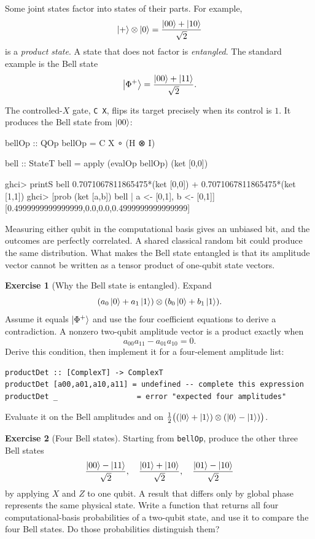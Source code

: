\documentclass[11pt,a4paper]{article}
\theoremstyle{definition}
\newtheorem{exercise}{Exercise}[section]
\begin{document}
Some joint states factor into states of their parts.  For example,
\[
  \left| + \right\rangle\otimes\left| 0 \right\rangle=\frac{\left| 00 \right\rangle+\left| 10 \right\rangle}{\sqrt2}
\]
is a \emph{product state}.  A state that does not factor is
\emph{entangled}.  The standard example is the Bell state
\[
  \left| \Phi^+ \right\rangle=\frac{\left| 00 \right\rangle+\left| 11 \right\rangle}{\sqrt2}.
\]

The controlled-$X$ gate, \lstinline|C X|, flips its target precisely when
its control is $1$.  It produces the Bell state from $\left| 00 \right\rangle$:
\begin{qppcode}
bellOp :: QOp
bellOp = C X ∘ (H ⊗ I)

bell :: StateT
bell = apply (evalOp bellOp) (ket [0,0])

ghci> printS bell
0.7071067811865475*(ket [0,0]) + 0.7071067811865475*(ket [1,1])
ghci> [prob (ket [a,b]) bell | a <- [0,1], b <- [0,1]]
[0.4999999999999999,0.0,0.0,0.4999999999999999]
\end{qppcode}
Measuring either qubit in the computational basis gives an unbiased bit, and
the outcomes are perfectly correlated.  A shared classical random bit could
produce the same distribution.  What makes the Bell state entangled is that
its amplitude vector cannot be written as a tensor product of one-qubit state
vectors.

\begin{exercise}[Why the Bell state is entangled]
Expand
\[
  (a_0\left| 0 \right\rangle+a_1\left| 1 \right\rangle)\otimes(b_0\left| 0 \right\rangle+b_1\left| 1 \right\rangle).
\]
Assume it equals $\left| \Phi^+ \right\rangle$ and use the four coefficient equations to
derive a contradiction.  A nonzero two-qubit amplitude vector is a product
exactly when
\[
  a_{00}a_{11}-a_{01}a_{10}=0.
\]
Derive this condition, then implement it for a four-element amplitude list:
\begin{lstlisting}
productDet :: [ComplexT] -> ComplexT
productDet [a00,a01,a10,a11] = undefined -- complete this expression
productDet _                  = error "expected four amplitudes"
\end{lstlisting}
Evaluate it on the Bell amplitudes and on
$\frac12\bigl((\left| 0 \right\rangle+\left| 1 \right\rangle)\otimes(\left| 0 \right\rangle-\left| 1 \right\rangle)\bigr)$.
\end{exercise}

\begin{exercise}[Four Bell states]
Starting from \lstinline|bellOp|, produce the other three Bell states
\[
 \frac{\left| 00 \right\rangle-\left| 11 \right\rangle}{\sqrt2},\quad
 \frac{\left| 01 \right\rangle+\left| 10 \right\rangle}{\sqrt2},\quad
 \frac{\left| 01 \right\rangle-\left| 10 \right\rangle}{\sqrt2}
\]
by applying $X$ and $Z$ to one qubit.  A result that differs only by global
phase represents the same physical state.  Write a function that returns all
four computational-basis probabilities of a two-qubit state, and use it to
compare the four Bell states.  Do those probabilities distinguish them?
\end{exercise}
\end{document}
